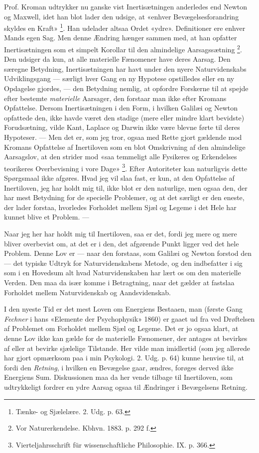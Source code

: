 \documentclass[12pt,a4paper,openany]{book}
\newcommand{\opage}[1]{\marginnote{\footnotesize\textit{[#1]}}}
\begin{document}
Prof. Kroman udtrykker nu ganske vist Inertisætningen anderledes end Newton og
Maxwell, idet han blot lader den udsige, at «enhver Bevægelsesforandring
skyldes en Kraft»%
\footnote[1]{Tænke- og Sjælelære. 2. Udg. p. 63.}. Han udelader altsaa Ordet
«ydre». Definitioner ere enhver Mands egen Sag. Men denne Ændring hænger sammen
med, at han opfatter Inertisætningen som et simpelt Korollar til den
almindelige Aarsagssætning%
\footnote[2]{Vor Naturerkendelse. Kbhvn. 1883. p. 292 f.}. Den udsiger da kun,
at alle materielle Fænomener have deres Aarsag. Den særegne Betydning,
Inertisætningen har havt under den nyere Naturvidenskabs Udviklingsgang ---
særligt hver Gang en ny Hypotese opstilledes eller en ny Opdagelse gjordes, ---
den Betydning nemlig, at opfordre Forskerne til at spejde efter bestemte
\emph{materielle} Aarsager, den forstaar man ikke efter Kromans Opfattelse.
Dersom Inertisætningen i den Form, i hvilken Galilæi og Newton opfattede den,
ikke havde været den stadige (mere eller mindre klart bevidste) Forudsætning,
vilde Kant, Laplace og Darwin ikke være blevne førte til deres Hypoteser. ---
Men det er, som jeg tror, ogsaa med Rette gjort gældende mod Kromans Opfattelse
af Inertiloven som en blot Omskrivning af den almindelige Aarsagslov, at den
strider mod «saa temmeligt alle Fysikeres og Erkendelses%
\setcounter{footnote}{0}%
\opage{84}teorikeres Overbevisning i vore Dage»%
\footnote[1]{Vierteljahrsschrift für wissenschaftliche Philosophie. IX. p.
366.}. Efter Autoriteter kan naturligvis dette Spørgsmaal ikke afgøres. Hvad
jeg vil slaa fast, er kun, at den Opfattelse af Inertiloven, jeg har holdt mig
til, ikke blot er den naturlige, men ogsaa den, der har mest Betydning for de
specielle Problemer, og at det særligt er den eneste, der lader forstaa,
hvorledes Forholdet mellem Sjæl og Legeme i det Hele har kunnet blive et Problem. ---

Naar jeg her har holdt mig til Inertiloven, saa er det, fordi jeg mere og mere
bliver overbevist om, at det er i den, det afgørende Punkt ligger ved det hele
Problem. Denne Lov er --- naar den forstaas, som Galilæi og Newton forstod den
--- det typiske Udtryk for Naturvidenskabens Metode, og den indbefatter i sig
som i en Hovedsum alt hvad Naturvidenskaben har lært os om den materielle
Verden. Den maa da især komme i Betragtning, naar det gælder at fastslaa
Forholdet mellem Naturvidenskab og Aandsvidenskab.

I den nyeste Tid er det mest Loven om Energiens Bestaaen, man (første Gang
\emph{Fechner} i hans «Elemente der Psychophysik» 1860) er gaaet ud fra ved
Drøftelsen af Problemet om Forholdet mellem Sjæl og Legeme. Det er jo ogsaa
klart, at denne Lov ikke kan gælde for de materielle Fænomener, der antages at
bevirkes af eller at bevirke sjælelige Tilstande. Her vilde man imidlertid (som
jeg allerede har gjort opmærksom paa i min Psykologi. 2. Udg. p. 64) kunne
henvise til, at fordi den \emph{Retning}, i hvilken en Bevægelse gaar, ændres,
forøges derved ikke Energiens Sum. Diskussionen maa da her vende tilbage til
Inertiloven, som udtrykkeligt fordrer en ydre Aarsag ogsaa til Ændringer i
Bevægelsens Retning.
\end{document}
